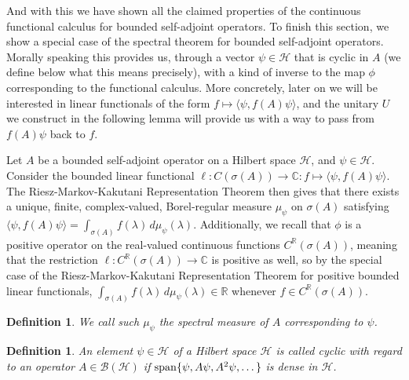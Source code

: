 \documentclass[12pt,oneside]{report}
\newtheorem{defn}[thm]{Definition}
\begin{document}
And with this we have shown all the claimed properties of the continuous functional calculus for bounded self-adjoint operators. To finish this section, we show a special case of the spectral theorem for bounded self-adjoint operators. Morally speaking this provides us, through a vector $\psi \in \mathscr{H}$ that is cyclic in $A$ (we define below what this means precisely), with a kind of inverse to the map $\phi$ corresponding to the functional calculus. More concretely, later on we will be interested in linear functionals of the form $f \mapsto \langle \psi, f(A) \psi \rangle$, and the unitary $U$ we construct in the following lemma will provide us with a way to pass from $f(A)\psi$ back to $f$.

Let $A$ be a bounded self-adjoint operator on a Hilbert space $\mathscr{H}$, and $\psi \in \mathscr{H}$. Consider the bounded linear functional $\ell: C(\sigma(A)) \to \mathbb{C}: f \mapsto \langle \psi, f(A) \psi \rangle$. The Riesz-Markov-Kakutani Representation Theorem then gives that there exists a unique, finite, complex-valued, Borel-regular measure $\mu_{\psi}$ on $\sigma(A)$ satisfying $\langle \psi, f(A)\psi \rangle = \int _{\sigma(A)} f(\lambda) \, d\mu_{\psi}(\lambda)$. Additionally, we recall that $\phi$ is a positive operator on the real-valued continuous functions $C^{\mathbb{R}}(\sigma(A))$, meaning that the restriction $\ell: C^{\mathbb{R}}(\sigma(A)) \to \mathbb{C}$ is positive as well, so by the special case of the Riesz-Markov-Kakutani Representation Theorem for positive bounded linear functionals, $\int _{\sigma(A)} f(\lambda) \, d\mu_{\psi}(\lambda) \in \mathbb{R}$ whenever $f \in C^{\mathbb{R}}(\sigma(A))$.

\begin{defn}
    We call such $\mu_{\psi}$ the spectral measure of $A$ corresponding to $\psi$.
\end{defn}

\begin{defn}
    An element $\psi \in \mathscr{H}$ of a Hilbert space $\mathscr{H}$ is called cyclic with regard to an operator $A \in \mathscr{B}(\mathscr{H})$ if $\mathrm{span}\{ \psi, A\psi, A^{2}\psi, \dots \}$ is dense in $\mathscr{H}$.
\end{defn}
\end{document}
